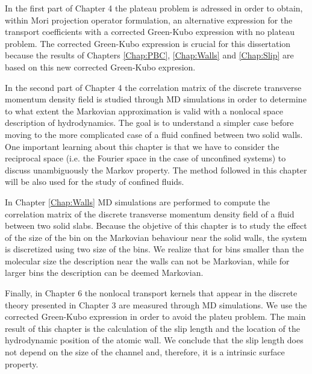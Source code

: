 \documentclass[b5paper,openright,10pt]{book}
\begin{document}
In the first part of Chapter 4 the plateau problem is adressed in order to obtain, within Mori projection operator formulation, an alternative expression for the transport coefficients with a corrected Green-Kubo expression with no plateau problem. 
The corrected Green-Kubo expression is crucial for this dissertation because the results of Chapters \ref{Chap:PBC}, \ref{Chap:Walls} and \ref{Chap:Slip} are based on this new corrected Green-Kubo expresion. 

In the second part of Chapter 4 the correlation matrix of the discrete transverse momentum density field is studied through MD simulations in order to determine to what extent the Markovian approximation is valid with a nonlocal space description of hydrodynamics. 
The goal is to understand a simpler case before moving to the more complicated case of a fluid confined between two solid walls. 
One important learning about this chapter is that we have to consider the reciprocal space (i.e. the Fourier space in the case of unconfined systems) to discuss unambiguously the Markov property.
The method followed in this chapter will be also used for the study of  confined fluids. 

In Chapter \ref{Chap:Walls} MD simulations are performed to compute the correlation matrix of the discrete transverse momentum density field of a fluid between two solid slabs. 
Because the objetive of this chapter is to study the effect of the size of the bin on the Markovian behaviour near the solid walls, the system is discretized using two size of the bins. We realize that for bins smaller than the molecular size the description near the walls can not be Markovian, while for larger bins the description can be deemed Markovian.  

Finally, in Chapter 6  the nonlocal transport kernels that appear in the discrete theory presented in  Chapter 3 are measured through MD simulations. 
We use the corrected Green-Kubo expression in order to avoid the plateu problem. 
The main result of this chapter is the calculation of the slip length and the location of the hydrodynamic position of the atomic wall. We conclude that the slip length does not depend on the size of the channel and, therefore, it is a intrinsic surface property.  
\end{document}
